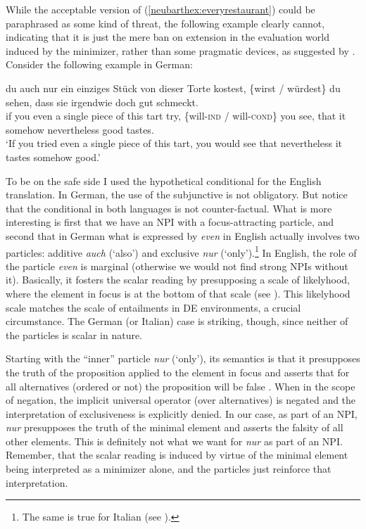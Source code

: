\documentclass[output=paper,colorlinks,citecolor=brown,
]{langscibook}
\begin{document}
While the acceptable version of (\ref{neubarthex:everyrestaurant}) could be paraphrased as some kind of threat, the following
example clearly cannot, indicating that it is just the mere ban on extension in the evaluation world induced by the
minimizer, rather than some pragmatic devices, as suggested by \citet{linebarger1987}. Consider the following example
in German:

\ea
   {du} {auch nur} {ein} {einziges} {Stück} {von} {dieser} {Torte} {kostest,} {\{{wirst} /} {würdest}\} {du} {sehen,} {dass} {sie} {irgendwie} {doch} {gut} {schmeckt.}\\
       if you even a single piece of this tart try, {\{will-\textsc{ind} /} will-\textsc{cond}\} you see, that it somehow nevertheless good tastes.\\
  \glt `If you tried even a single piece of this tart, you would see that nevertheless it tastes somehow good.'
\z

To be on the safe side I used the hypothetical conditional for the English translation. In German, the use of the
subjunctive is not obligatory. But notice that the conditional in both languages is not counter-factual. What is more
interesting is first that we have an NPI with a focus-attracting particle, and second that in German what is expressed
by \textit{even} in English actually involves two particles: additive \textit{auch} (`also') and exclusive \textit{nur}
(`only').\footnote{The same is true for Italian (see \citealt{guerzoni03}).} In English, the role of the particle
\textit{even} is marginal (otherwise we would not find strong NPIs without it). Basically, it fosters the scalar
reading by presupposing a scale of likelyhood, where the element in focus is at the bottom of that scale (see
\citealt{leehorn1994}). This likelyhood scale matches the scale of entailments in DE environments, a crucial
circumstance. The German (or Italian) case is striking, though, since neither of the particles is scalar in nature.

Starting with the “inner” particle \textit{nur} (`only'), its semantics is that it presupposes the truth of the
proposition applied to the element in focus and asserts that for all alternatives (ordered or not) the proposition will
be false \citep{krifka1998a,wagner2005}. When in the scope of negation, the implicit universal operator (over
alternatives) is negated and the interpretation of exclusiveness is explicitly denied. In our case, as part of an NPI,
\textit{nur} presupposes the truth of the minimal element and asserts the falsity of all other elements. This is
definitely not what we want for \textit{nur} as part of an NPI. Remember, that the scalar reading is induced by virtue
of the minimal element being interpreted as a minimizer alone, and the particles just reinforce that interpretation.
\end{document}
